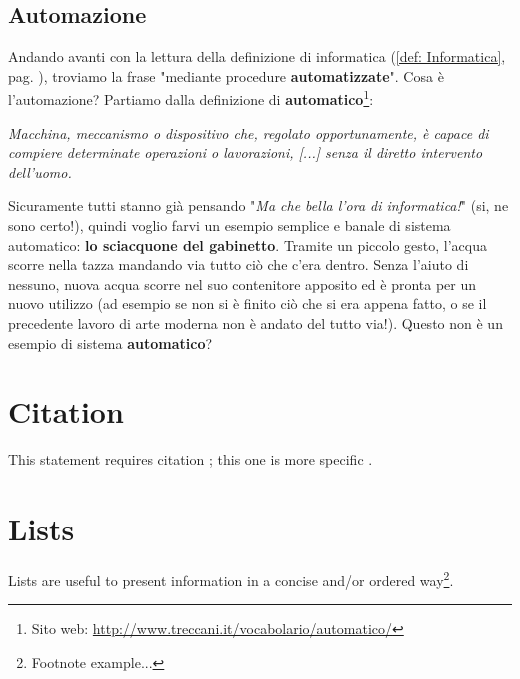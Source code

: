 \documentclass[11pt,fleqn,a5paper]{book} %
\begin{document}
    		\subsection{Automazione}
    		\label{sub: Automazione}
    			Andando avanti con la lettura della definizione di informatica (\ref{def: Informatica}, pag. \pageref{def: Informatica}), troviamo la frase "mediante procedure \textbf{automatizzate}". Cosa è l'automazione? Partiamo dalla definizione di \textbf{automatico}\footnote{Sito web: \url{http://www.treccani.it/vocabolario/automatico/}}:
    			\begin{definition}[Automatico]\label{def: Automatico}
    				\textit{Macchina, meccanismo o dispositivo che, regolato opportunamente, è capace di compiere determinate operazioni o lavorazioni, [...] senza il diretto intervento dell'uomo.}
    			\end{definition}
    		
    			Sicuramente tutti stanno già pensando "\textit{Ma che bella l'ora di informatica!}" (si, ne sono certo!), quindi voglio farvi un esempio semplice e banale di sistema automatico: \textbf{lo sciacquone del gabinetto}. Tramite un piccolo gesto, l'acqua scorre nella tazza mandando via tutto ciò che c'era dentro. Senza l'aiuto di nessuno, nuova acqua scorre nel suo contenitore apposito ed è pronta per un nuovo utilizzo (ad esempio se non si è finito ciò che si era appena fatto, o se il precedente lavoro di arte moderna non è andato del tutto via!). Questo non è un esempio di sistema \textbf{automatico}?
    			
    			
        
    
        \section{Citation}
    
        This statement requires citation \cite{book_key}; this one is more specific \cite[122]{article_key}.
    
    
    \section{Lists}
    
    Lists are useful to present information in a concise and/or ordered way\footnote{Footnote example...}.
    
\end{document}

